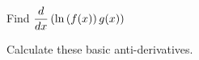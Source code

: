 \begin{questions}
\question Find $\displaystyle \displaystyle \frac{d}{dx}\left(\ln\left(f(x)\right)g(x)\right)$
\begin{solutionorbox}[2.5in]

\end{solutionorbox}

\newpage

\question Calculate these basic anti-derivatives.
\begin{multicols}{3}


\end{multicols}
\end{questions}
